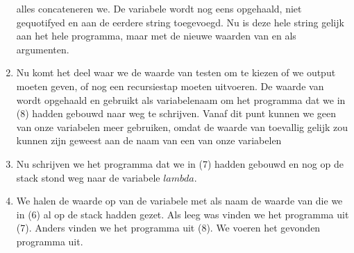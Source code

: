 \begin{enumerate}
		alles concateneren we. De variabele  wordt nog eens
		opgehaald, niet gequotifyed en aan de eerdere string toegevoegd. Nu is deze
		hele string gelijk aan het hele programma, maar met de nieuwe waarden van
		 en  als argumenten.
	\item Nu komt het deel waar we de waarde van  testen om
		te kiezen of we output moeten geven, of nog een recursiestap moeten
		uitvoeren. De waarde van  wordt opgehaald en gebruikt
		als variabelenaam om het programma dat we in (8) hadden gebouwd naar weg te
		schrijven. Vanaf dit punt kunnen we geen van onze variabelen meer
		gebruiken, omdat de waarde van  toevallig gelijk zou
		kunnen zijn geweest aan de naam van een van onze variabelen
	\item Nu schrijven we het programma dat we in (7) hadden gebouwd en nog op de
		stack stond weg naar de variabele $lambda$.
	\item We halen de waarde op van de variabele met als naam de waarde van
		 die we in (6) al op de stack hadden gezet. Als
		 leeg was vinden we het programma uit (7). Anders
		vinden we het programma uit (8). We voeren het gevonden programma uit.
\end{enumerate}
